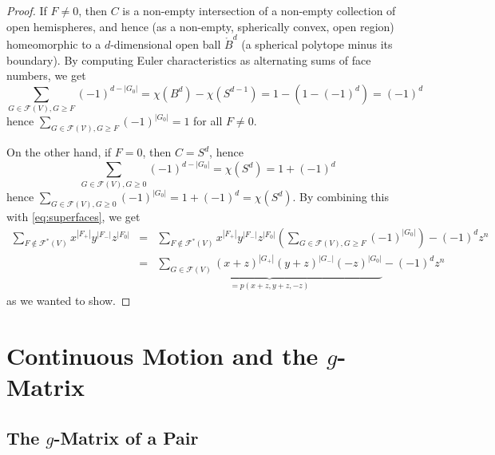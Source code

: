 \documentclass[a4paper,USenglish,cleveref, autoref, thm-restate,nolineno]{socg-lipics-v2021}
\renewcommand{\geq}{\geqslant}
\begin{document}
\begin{proof}
If $F\neq 0$, then $C$ is a non-empty intersection of a non-empty collection of open hemispheres, and hence (as a non-empty, spherically convex, open region) homeomorphic to a $d$-dimensional open ball $\mathring{B}^d$ (a spherical polytope minus its boundary). By computing Euler characteristics as alternating sums of face numbers, we get
\[
\sum_{G\in \mathcal{F}(V), G\geq F} (-1)^{d-|G_0|}=\chi(B^d)-\chi(S^{d-1})=1-(1-(-1)^d)=(-1)^d
\]
hence $\sum_{G\in \mathcal{F(V)}, G\geq F}(-1)^{|G_0|}=1$ for all $F\neq 0$. 

On the other hand, if $F = 0$, then $C=S^d$, hence
\[
\sum_{G\in \mathcal{F}(V), G\geq 0} (-1)^{d-|G_0|}=\chi(S^d)=1+(-1)^d
\]
hence $\sum_{G\in \mathcal{F}(V), G\geq 0}(-1)^{|G_0|}=1+(-1)^d=\chi(S^d)$.
By combining this with \eqref{eq:superfaces}, we get
\begin{eqnarray*}
\sum_{F \not\in \mathcal{F}^*(V)} x^{|F_+|} y^{|F_-|} z^{|F_0|} &= & \sum_{F \not\in \mathcal{F}^*(V)} x^{|F_+|} y^{|F_-|} z^{|F_0|}\left( \sum_{G\in \mathcal{F}(V), G\geq F} (-1)^{|G_0|} \right)-(-1)^d z^n \\
&= & \underbrace{\sum_{G\in \mathcal{F}(V)} (x+z)^{|G_+|} (y+z)^{|G_-|} (-z)^{|G_0|}}_{=p(x+z,y+z,-z)}-(-1)^d z^n
\end{eqnarray*}
as we wanted to show.
\end{proof}

\section{Continuous Motion and the $g$-Matrix}
\label{sec:g-matrix}

\subsection{The $g$-Matrix of a Pair}
\label{sec:g-pair}
\end{document}
